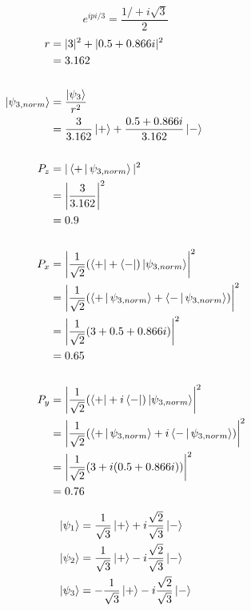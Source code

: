 \documentclass[12pt]{article}
\begin{document}
    \problemsub
    $$e^{i pi / 3} = \frac{1/ + i\sqrt{3}}{2}$$
    \begin{align*}
        r &= |3|^2 + |0.5+0.866i|^2 \\
            &= 3.162 \\
        \\ 
        \Ket{\psi_{3,norm}} &= \frac{\Ket{\psi_3}}{r^2} \\
                             &= \frac{3}{3.162}\Ket{+} + \frac{0.5+0.866i}{3.162}\Ket{-} \\
        \\
        P_z &= |\Braket{+|\psi_{3,norm}}|^2 \\
            &= \left|\frac{3}{3.162}\right|^2 \\
            &= 0.9 \\
        \\
        P_x &= \left|\frac{1}{\sqrt{2}}
            (\Bra{+} + \Bra{-})\Ket{\psi_{3,norm}}\right|^2 \\
            &= \left|\frac{1}{\sqrt{2}}
            (\Braket{+|\psi_{3,norm}} + \Braket{-|\psi_{3,norm}})\right|^2 \\
            &= \left|\frac{1}{\sqrt{2}} (3 + 0.5+0.866i)\right|^2 \\
            &= 0.65 \\
        \\
        P_y &= \left|\frac{1}{\sqrt{2}}
            (\Bra{+} + i\Bra{-})\Ket{\psi_{3,norm}}\right|^2 \\
            &= \left|\frac{1}{\sqrt{2}}
            (\Braket{+|\psi_{3,norm}} + i\Braket{-|\psi_{3,norm}})\right|^2 \\
            &= \left|\frac{1}{\sqrt{2}} (3 + i(0.5+0.866i))\right|^2 \\
            &= 0.76
    \end{align*}



\problem

\begin{align*}
\Ket{\psi_1} &= \frac{1}{\sqrt{3}} \Ket{+} + i \frac{\sqrt{2}}{\sqrt{3}} \Ket{-} \\
\Ket{\psi_2} &= \frac{1}{\sqrt{3}} \Ket{+} - i \frac{\sqrt{2}}{\sqrt{3}} \Ket{-} \\
\Ket{\psi_3} &= -\frac{1}{\sqrt{3}} \Ket{+} - i \frac{\sqrt{2}}{\sqrt{3}} \Ket{-}
\end{align*}
\end{document}
